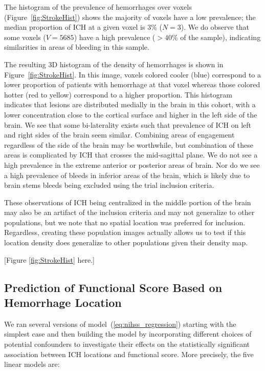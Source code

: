 \documentclass[10pt]{article}\usepackage[]{graphicx}\usepackage[]{color}
\begin{document}
The histogram of the prevalence of hemorrhages over voxels (Figure~\ref{fig:StrokeHist}\protect{}) shows the majority of voxels have a low prevalence; the median proportion of ICH at a given voxel is 3\% ($N = 3$).  We do observe that some voxels ($V = 5685$) have a high prevalence ($> 40\%$ of the sample), indicating similarities in areas of bleeding in this sample.  


The resulting 3D histogram of the density of hemorrhages is shown in Figure~\ref{fig:StrokeHist}\protect{}.
In this image, voxels colored cooler (blue) correspond to a lower proportion of
patients with hemorrhage at that voxel whereas those colored hotter (red to yellow) correspond to a higher proportion. This histogram indicates that lesions are
distributed medially in the brain in this cohort, with a lower concentration
close to the cortical surface and higher in the left side of the brain.  We see that some bi-laterality exists such that prevalence of ICH on left and right sides of the brain seem similar.  Combining areas of engagement regardless of the side of the brain may be worthwhile, but combination of these areas is complicated by ICH that crosses the mid-sagittal plane.  
We do not see a high prevalence in the extreme anterior or posterior areas of brain.  Nor do we see a high prevalence of bleeds in inferior areas of the brain, which is likely due to brain stems bleeds being excluded using the trial inclusion criteria.  

These observations of ICH being centralized in the middle portion of the brain may also be an artifact of the inclusion criteria and may not generalize to other populations, but we note that no spatial location was preferred for inclusion.  Regardless, creating these population images actually allows us to test if this location density does generalize to other populations given their density map.


[Figure \ref{fig:StrokeHist} here.]


\subsection*{Prediction of Functional Score Based on Hemorrhage Location}

We ran several versions of model~(\ref{eq:nihss_regression}) starting with the simplest case and then building the model by incorporating different choices of potential confounders to investigate their effects on the statistically significant association between ICH locations and functional score. More precisely, the five linear models are:
\end{document}
